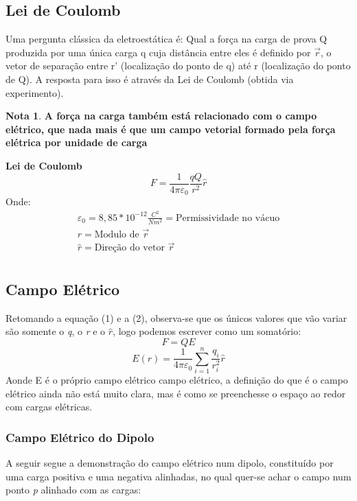 \documentclass[11pt]{article}
\theoremstyle{definition}
\newtheorem{note}{Nota}
\begin{document}
\subsection{Lei de Coulomb}
Uma pergunta clássica da eletroestática é: Qual a força na carga de prova Q produzida por uma única carga q cuja distância entre eles é definido por $\vec{r}$, o vetor de separação entre r' (localização do ponto de q) até r (localização do ponto de Q). A resposta para isso é através da Lei de Coulomb (obtida via experimento).
\begin{note}
    \textbf{A força na carga também está relacionado com o campo elétrico, que nada mais é que um campo vetorial formado pela força elétrica por unidade de carga}
\end{note}
\begin{shaded}
\textbf{Lei de Coulomb} \newline
\begin{equation}
F=\frac{1}{4\pi\varepsilon_\mathrm{0}}\frac{qQ}{r^2}\hat{r}
\end{equation}
Onde:
\begin{equation*}
\begin{split}
\varepsilon_\mathrm{0} =8,85*10^{-12}\frac{C^2}{Nm^2} = \text{Permissividade no vácuo} \\
r = \text{Modulo de $\vec{r}$} \\
\hat{r} = \text{Direção do vetor $\vec{r}$}\\
\end{split}
\end{equation*}
\end{shaded}
\newpage
\subsection{Campo Elétrico}
Retomando a equação (1) e a (2), observa-se que os únicos valores que vão variar são somente o \textit{q}, o \textit{r} e o $\hat{r}$, logo podemos escrever como um somatório:
\begin{equation}
    F=QE
\end{equation}
\begin{equation}
     E(r)=\frac{1}{4\pi\varepsilon_\mathrm{0}}\sum_{i=1}^{n}\frac{q_{i}}{r_{i}^{2}}\hat{r}
\end{equation}
Aonde E é o próprio campo elétrico campo elétrico, a definição do que é o campo elétrico ainda não está muito clara, mas é como se preenchesse o espaço ao redor com cargas elétricas.


\subsubsection{Campo Elétrico do Dipolo}
A seguir segue a demonstração do campo elétrico num dipolo, constituído por uma carga positiva e uma negativa alinhadas, no qual quer-se achar o campo num ponto \textit{p} alinhado com as cargas:
\end{document}
